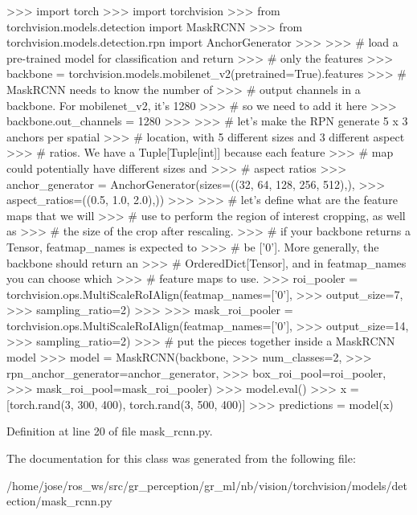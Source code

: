 \begin{DoxyVerb}
    >>> import torch
    >>> import torchvision
    >>> from torchvision.models.detection import MaskRCNN
    >>> from torchvision.models.detection.rpn import AnchorGenerator
    >>>
    >>> # load a pre-trained model for classification and return
    >>> # only the features
    >>> backbone = torchvision.models.mobilenet_v2(pretrained=True).features
    >>> # MaskRCNN needs to know the number of
    >>> # output channels in a backbone. For mobilenet_v2, it's 1280
    >>> # so we need to add it here
    >>> backbone.out_channels = 1280
    >>>
    >>> # let's make the RPN generate 5 x 3 anchors per spatial
    >>> # location, with 5 different sizes and 3 different aspect
    >>> # ratios. We have a Tuple[Tuple[int]] because each feature
    >>> # map could potentially have different sizes and
    >>> # aspect ratios
    >>> anchor_generator = AnchorGenerator(sizes=((32, 64, 128, 256, 512),),
    >>>                                    aspect_ratios=((0.5, 1.0, 2.0),))
    >>>
    >>> # let's define what are the feature maps that we will
    >>> # use to perform the region of interest cropping, as well as
    >>> # the size of the crop after rescaling.
    >>> # if your backbone returns a Tensor, featmap_names is expected to
    >>> # be ['0']. More generally, the backbone should return an
    >>> # OrderedDict[Tensor], and in featmap_names you can choose which
    >>> # feature maps to use.
    >>> roi_pooler = torchvision.ops.MultiScaleRoIAlign(featmap_names=['0'],
    >>>                                                 output_size=7,
    >>>                                                 sampling_ratio=2)
    >>>
    >>> mask_roi_pooler = torchvision.ops.MultiScaleRoIAlign(featmap_names=['0'],
    >>>                                                      output_size=14,
    >>>                                                      sampling_ratio=2)
    >>> # put the pieces together inside a MaskRCNN model
    >>> model = MaskRCNN(backbone,
    >>>                  num_classes=2,
    >>>                  rpn_anchor_generator=anchor_generator,
    >>>                  box_roi_pool=roi_pooler,
    >>>                  mask_roi_pool=mask_roi_pooler)
    >>> model.eval()
    >>> x = [torch.rand(3, 300, 400), torch.rand(3, 500, 400)]
    >>> predictions = model(x)
\end{DoxyVerb}
 

Definition at line 20 of file mask\+\_\+rcnn.\+py.



The documentation for this class was generated from the following file\+:\begin{DoxyCompactItemize}
\item 
/home/jose/ros\+\_\+ws/src/gr\+\_\+perception/gr\+\_\+ml/nb/vision/torchvision/models/detection/mask\+\_\+rcnn.\+py\end{DoxyCompactItemize}
